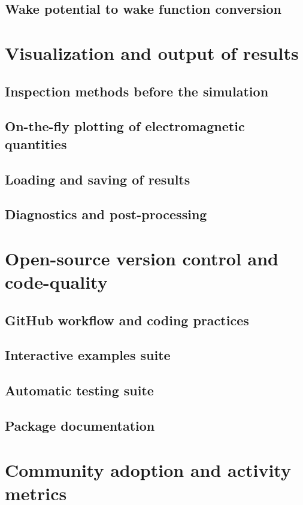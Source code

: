 \subsection{Wake potential to wake function conversion}

\section{Visualization and output of results}

\subsection{Inspection methods before the simulation}

\subsection{On-the-fly plotting of electromagnetic quantities}

\subsection{Loading and saving of results}

\subsection{Diagnostics and post-processing}

\section{Open-source version control and code-quality}

\subsection{GitHub workflow and coding practices}

\subsection{Interactive examples suite}

\subsection{Automatic testing suite}

\subsection{Package documentation}

\section{Community adoption and activity metrics}